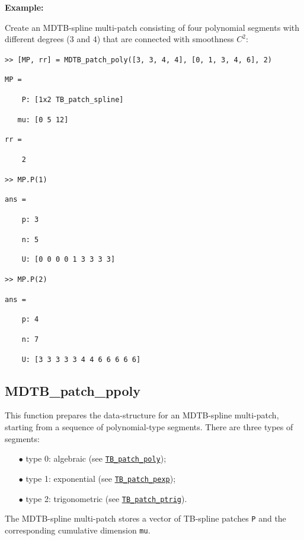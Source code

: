 \documentclass[10pt]{acmtrans2e}
\newenvironment{example}
{\vspace*{0.1cm}
\noindent \textbf{Example:} \vspace*{0.15cm}

\setlength{\parskip}{0.5ex plus 0.5exminus 0.2 ex}
}
{\medskip
}
\begin{document}
\begin{example}
\noindent Create an MDTB-spline multi-patch consisting of four polynomial segments with different degrees ($3$ and $4$) that are connected with smoothness $C^2$: 
\medskip

\texttt{>> [MP, rr] = MDTB\_patch\_poly([3, 3, 4, 4], [0, 1, 3, 4, 6], 2)}

\texttt{MP = }

\texttt{\ \ \ \ P:\ [1x2 TB\_patch\_spline]}

\texttt{\ \ \ mu:\ [0 5 12]}

\texttt{rr = }

\texttt{\ \ \ \ 2}

\texttt{>> MP.P(1)}

\texttt{ans =}

\texttt{\ \ \ \ p:\ 3}

\texttt{\ \ \ \ n:\ 5}

\texttt{\ \ \ \ U:\ [0 0 0 0 1 3 3 3 3]}

\texttt{>> MP.P(2)}

\texttt{ans =}

\texttt{\ \ \ \ p:\ 4}

\texttt{\ \ \ \ n:\ 7}

\texttt{\ \ \ \ U:\ [3 3 3 3 3 4 4 6 6 6 6 6]}    
\end{example}


\subsection{MDTB\_patch\_ppoly} \label{sec:matlab-mdtb-patch-ppoly}

This function prepares the data-structure for an MDTB-spline multi-patch, starting from a sequence of polynomial-type segments. There are three types of segments:
\begin{itemize}
  \item[$\bullet$] type 0: algebraic (see \hyperref[sec:matlab-tb-patch-poly]{\texttt{TB\_patch\_poly}});
  \item[$\bullet$] type 1: exponential (see \hyperref[sec:matlab-tb-patch-pexp]{\texttt{TB\_patch\_pexp}});
  \item[$\bullet$] type 2: trigonometric (see \hyperref[sec:matlab-tb-patch-ptrig]{\texttt{TB\_patch\_ptrig}}).
\end{itemize}
The MDTB-spline multi-patch stores a vector of TB-spline patches \texttt{P} and the corresponding cumulative dimension \texttt{mu}. 
\end{document}
